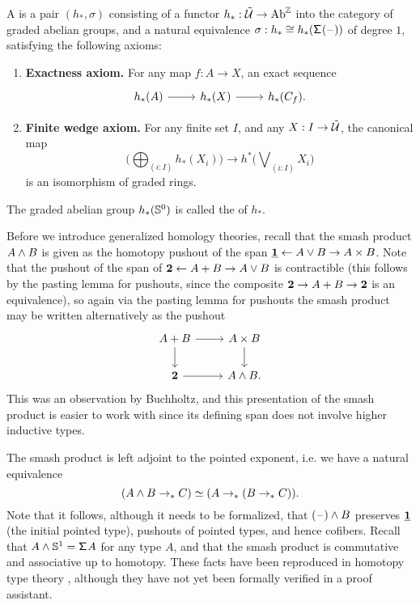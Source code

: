 \documentclass[reqno]{amsart}
\begin{document}
\begin{defn}
A  \cite{Whitehead62,Kochman96} is a pair $(h_\ast,\sigma)$ consisting of a functor $h_\ast :\tilde{\mathcal{U}}\to\mathrm{Ab}^\mathbb{Z}$ into the category of graded abelian groups, and a natural equivalence $\sigma:h_\ast\cong h_\ast(\mathsf{\Sigma}^{}(\mathord{\hspace{1pt}\text{--}\hspace{1pt}}))$ of degree $1$, satisfying the following axioms:
\begin{enumerate}
\item \textbf{Exactness axiom.} For any map $f:A\to X$, an exact sequence
\begin{equation*}
\begin{tikzcd}
h_\ast(A) \arrow[r] & h_\ast(X) \arrow[r] & h_\ast(C_f).
\end{tikzcd}
\end{equation*}
\item \textbf{Finite wedge axiom.} For any finite set $I$, and any $X:I\to\tilde{\mathcal{U}}$, the canonical map
\begin{equation*}
\Big(\bigoplus\nolimits_{(i:I)} h_\ast(X_i)\Big) \to h^\ast\Big(\bigvee\nolimits_{(i:I)} X_i\Big)
\end{equation*}
is an isomorphism of graded rings.
\end{enumerate}
The graded abelian group $h_\ast(\mathbb{S}^{0})$ is called the  of $h_\ast$. 
\end{defn}

Before we introduce generalized homology theories, recall that the smash product $A \wedge B$ is given as the homotopy pushout of the span $\underline{\mathbf{1}} \leftarrow A \vee B \rightarrow A\times B$.
Note that the pushout of the span of $\mathbf{2} \leftarrow A+B \rightarrow A \vee B$ is contractible (this follows by the pasting lemma for pushouts, since the composite $\mathbf{2} \to A+B \to \mathbf{2}$ is an equivalence),
so again via the pasting lemma for pushouts the smash product may be written alternatively as the pushout
\begin{equation*}
\begin{tikzcd}
A+B \arrow[r] \arrow[d] & A\times B \arrow[d] \\
\bool \arrow[r] & \smashpr{A}{B}.
\end{tikzcd}
\end{equation*}
This was an observation by Buchholtz, and this presentation of the smash product is easier to work with since its defining span does not involve higher inductive types. 

The smash product is left adjoint to the pointed exponent, i.e. we have a natural equivalence
\begin{equation*}
\eqv{(\smashpr{A}{B}\to_\ast C)}{(A\to_\ast(B\to_\ast C))}.
\end{equation*}
Note that it follows, although it needs to be formalized, that $(\mathord{\hspace{1pt}\text{--}\hspace{1pt}}) \wedge B$ preserves $\underline{\mathbf{1}}$ (the initial pointed type), pushouts of pointed types, and hence cofibers. Recall that $A \wedge \mathbb{S}^{1}=\mathsf{\Sigma}^{}{A}$ for any type $A$, and that the
smash product is commutative and associative up to homotopy. 
These facts have been reproduced
in homotopy type theory \cite{Brunerie16}, although they have not yet been formally
verified in a proof assistant.
\end{document}

